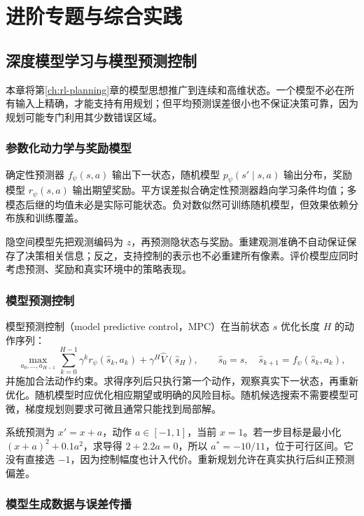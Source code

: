 \documentclass[UTF8,12pt,a4paper,fontset=fandol]{ctexbook}
\begin{document}
\part{进阶专题与综合实践}

\chapter{深度模型学习与模型预测控制}
\label{ch:rl-deep-model}

本章将第\ref{ch:rl-planning}章的模型思想推广到连续和高维状态。一个模型不必在所有输入上精确，才能支持有用规划；但平均预测误差很小也不保证决策可靠，因为规划可能专门利用其少数错误区域。

\section{参数化动力学与奖励模型}

确定性预测器 $f_\psi(s,a)$ 输出下一状态，随机模型 $p_\psi(s'\mid s,a)$ 输出分布，奖励模型 $r_\psi(s,a)$ 输出期望奖励。平方误差拟合确定性预测器趋向学习条件均值；多模态后继的均值未必是实际可能状态。负对数似然可训练随机模型，但效果依赖分布族和训练覆盖。

隐空间模型先把观测编码为 $z$，再预测隐状态与奖励。重建观测准确不自动保证保存了决策相关信息；反之，支持控制的表示也不必重建所有像素。评价模型应同时考虑预测、奖励和真实环境中的策略表现。

\section{模型预测控制}

模型预测控制（model predictive control，MPC）在当前状态 $s$ 优化长度 $H$ 的动作序列：
\[
\max_{a_0,\ldots,a_{H-1}}\sum_{k=0}^{H-1}\gamma^k r_\psi(\widehat s_k,a_k)
+\gamma^H\widehat V(\widehat s_H),\qquad
\widehat s_0=s,\quad\widehat s_{k+1}=f_\psi(\widehat s_k,a_k),
\]
并施加合法动作约束。求得序列后只执行第一个动作，观察真实下一状态，再重新优化。随机模型时应优化相应期望或明确的风险目标。随机候选搜索不需要模型可微，梯度规划则要求可微且通常只能找到局部解。

\begin{example}[一步规划的权衡]
系统预测为 $x'=x+a$，动作 $a\in[-1,1]$，当前 $x=1$。若一步目标是最小化 $(x+a)^2+0.1a^2$，求导得 $2+2.2a=0$，所以 $a^*=-10/11$，位于可行区间。它没有直接选 $-1$，因为控制幅度也计入代价。重新规划允许在真实执行后纠正预测偏差。
\end{example}

\section{模型生成数据与误差传播}
\end{document}
